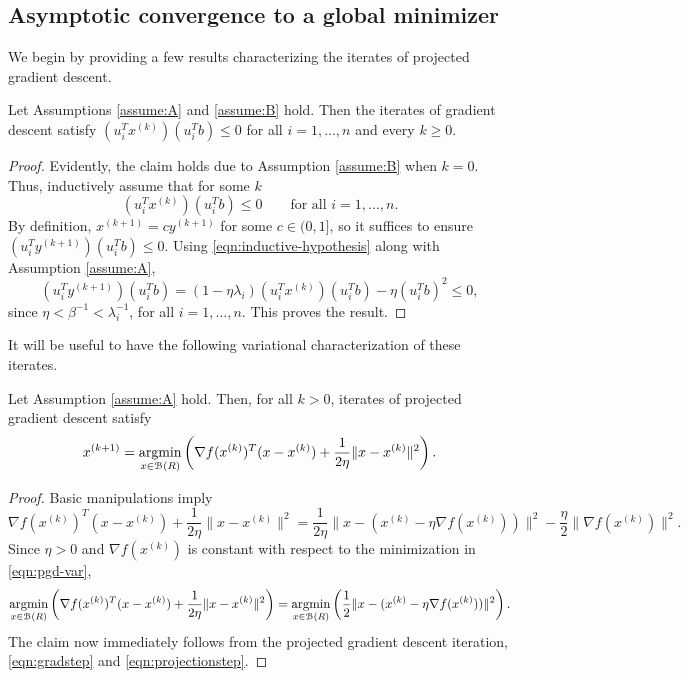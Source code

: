 \documentclass[11pt]{article}
\begin{document}
\subsection{Asymptotic convergence to a global minimizer}
We begin by providing a few results characterizing the iterates of projected gradient descent.
\begin{lem} 
\label{lem:signs}
Let Assumptions \ref{assume:A} and 
\ref{assume:B} hold. Then the iterates of 
gradient descent satisfy 
$(u_i^Tx^{(k)})(u_i^Tb)\leq 0$ for all $i = 1, \dots, n$ and every $k \geq 0$. 
\end{lem}
\begin{proof}
  Evidently, the claim holds due to Assumption \ref{assume:B} when $k = 0$. Thus, inductively assume that
  for some $k$
  \begin{equation}\label{eqn:inductive-hypothesis}
  (u_i^Tx^{(k)})(u_i^Tb)\leq 0 \qquad  \text{for all $i = 1, \dots, n$.}
  \end{equation}
  By definition, $x^{(k + 1)} = c y^{(k + 1)}$ for some $c \in (0 , 1]$, so it suffices to ensure
    $(u_i^Ty^{(k + 1)})(u_i^Tb) \leq 0$.
  Using \eqref{eqn:inductive-hypothesis} along with Assumption \ref{assume:A},
    \[
    (u_i^Ty^{(k + 1)})(u_i^Tb) = (1 - \eta \lambda_i) (u_i^Tx^{(k)})(u_i^Tb) - \eta (u_i^Tb)^2 \leq 0,
    \]
  since $\eta < \beta^{-1} < \lambda_i^{-1}$, for all $i =1 ,\dots, n$. This proves the result.  
\end{proof}
It will be useful to have the following variational characterization of these iterates. 
\begin{lem}
\label{lem:variational-char}
Let Assumption \ref{assume:A} hold. Then,
for all $k > 0$, iterates 
of projected gradient descent satisfy
\begin{equation}\label{eqn:pgd-var}
x^{(k + 1)} = 
\mathop{\rm argmin}_{x \in \mathcal{B}(R)} 
\left(\nabla f(x^{(k)})^T(x - x^{(k)}) + \frac{1}{2\eta} \|x - x^{(k)} \|^2\right).
\end{equation}
\end{lem}
\begin{proof}
  Basic manipulations imply
  \[
  \nabla f(x^{(k)})^T(x - x^{(k)}) + \frac{1}{2\eta} \|x - x^{(k)} \|^2 =
  \frac{1}{2\eta} \|x - (x^{(k)} - \eta \nabla f(x^{(k)}))\|^2 -\frac{\eta}{2}\|\nabla f(x^{(k)})\|^2. 
  \]
  Since $\eta > 0$ and $\nabla f(x^{(k)})$ is constant with respect to the minimization in \eqref{eqn:pgd-var},
  \[
  \mathop{\rm argmin}_{x \in \mathcal{B}(R)}
  \left(\nabla f(x^{(k)})^T(x - x^{(k)}) + \frac{1}{2\eta} \|x - x^{(k)} \|^2\right) =
  \mathop{\rm argmin}_{x \in \mathcal{B}(R)}
  \left(
  \frac{1}{2} \|x - (x^{(k)} - \eta \nabla f(x^{(k)}))\|^2
  \right).
  \]
  The claim now immediately follows from the projected gradient descent iteration, \eqref{eqn:gradstep} and
  \eqref{eqn:projectionstep}.
\end{proof}
\end{document}
